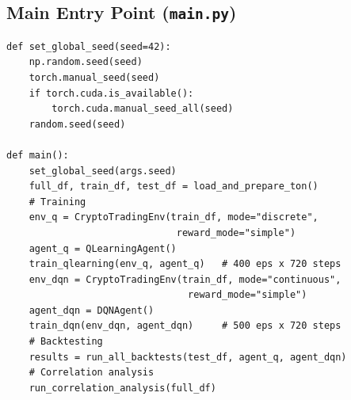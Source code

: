 \documentclass[11pt,a4paper]{article}
\begin{document}
\subsection{Main Entry Point (\texttt{main.py})}

\begin{lstlisting}
def set_global_seed(seed=42):
    np.random.seed(seed)
    torch.manual_seed(seed)
    if torch.cuda.is_available():
        torch.cuda.manual_seed_all(seed)
    random.seed(seed)

def main():
    set_global_seed(args.seed)
    full_df, train_df, test_df = load_and_prepare_ton()
    # Training
    env_q = CryptoTradingEnv(train_df, mode="discrete",
                              reward_mode="simple")
    agent_q = QLearningAgent()
    train_qlearning(env_q, agent_q)   # 400 eps x 720 steps
    env_dqn = CryptoTradingEnv(train_df, mode="continuous",
                                reward_mode="simple")
    agent_dqn = DQNAgent()
    train_dqn(env_dqn, agent_dqn)     # 500 eps x 720 steps
    # Backtesting
    results = run_all_backtests(test_df, agent_q, agent_dqn)
    # Correlation analysis
    run_correlation_analysis(full_df)
\end{lstlisting}
\end{document}
